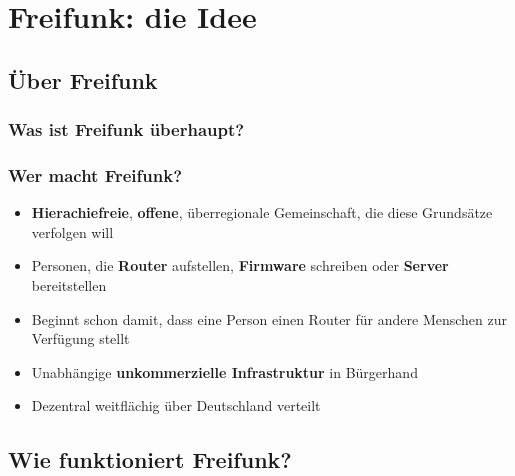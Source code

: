 \section{Freifunk: die Idee}
\subsection{Über Freifunk}

\begin{frame}
\frametitle{Was ist Freifunk überhaupt?}
\end{frame}

\begin{frame}
\frametitle{Wer macht Freifunk?}
	\begin{itemize}
		\item \textbf{Hierachiefreie}, \textbf{offene}, überregionale Gemeinschaft, die diese Grundsätze verfolgen will
		\item Personen, die \textbf{Router} aufstellen, \textbf{Firmware} schreiben oder \textbf{Server} bereitstellen
		\item Beginnt schon damit, dass eine Person einen Router für andere Menschen zur Verfügung stellt
		\item Unabhängige \textbf{unkommerzielle Infrastruktur} in Bürgerhand
		\item Dezentral weitflächig über Deutschland verteilt
	\end{itemize}
\end{frame}

\subsection{Wie funktioniert Freifunk?}


